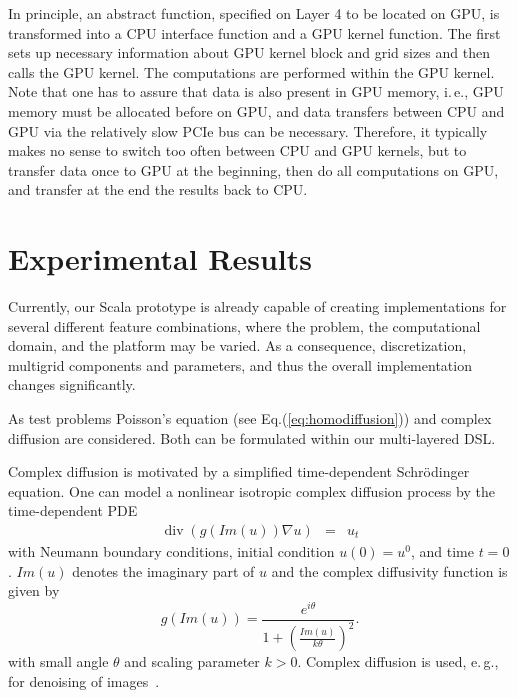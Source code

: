 \documentclass[onecolumn]{svjour3}
\renewcommand{\div}{\operatorname{div}}
\newcommand{\refeqn}[1]{(\ref{#1})}
\begin{document}
In principle, an abstract function, specified on Layer 4 to be located on GPU, is transformed into a CPU interface function and a GPU kernel function. The first sets up necessary information about GPU kernel block and grid sizes and then calls the GPU kernel. The computations are performed within the GPU kernel. Note that one has to assure that data is also present in GPU memory, i.\,e., GPU memory must be allocated before on GPU, and data transfers between CPU and GPU via the relatively slow PCIe bus can be necessary. Therefore, it typically makes no sense to switch too often between CPU and GPU kernels, but to transfer data once to GPU at the beginning, then do all computations on GPU, and transfer at the end the results back to CPU.











\section{Experimental Results} \label{sec:exp}

Currently, our Scala prototype is already capable of creating implementations for several different feature combinations, where the problem, the computational domain, and the platform may be varied. As a consequence, discretization, multigrid components and parameters, and thus the overall implementation changes significantly.

As test problems Poisson's equation (see Eq.\refeqn{eq:homodiffusion}) and complex diffusion are considered. Both can be formulated within our multi-layered DSL.

Complex diffusion is motivated by a simplified time-dependent Schr\"odinger equation. One can model a nonlinear isotropic complex diffusion process by the time-dependent PDE
\begin{eqnarray}  \label{eq:compldiffusion}
 \div \left( g \left( Im(u) \right) \nabla u \right)  &=& u_t
\end{eqnarray}
with Neumann boundary conditions, initial condition $u(0) = u^0$, and time $t = 0$.
$Im(u)$ denotes the imaginary part of $u$ and the complex diffusivity function is given by
\begin{equation}
g \left( Im(u) \right) = \frac{e^{i \theta}}{1 + \left( \frac{Im(u)}{k \theta} \right)^2} .
\end{equation} 
with small angle $\theta$ and scaling parameter $k > 0$. Complex diffusion is used, e.\,g., for denoising of images~\cite{gilboa2004,honigman2006}.
\end{document}
